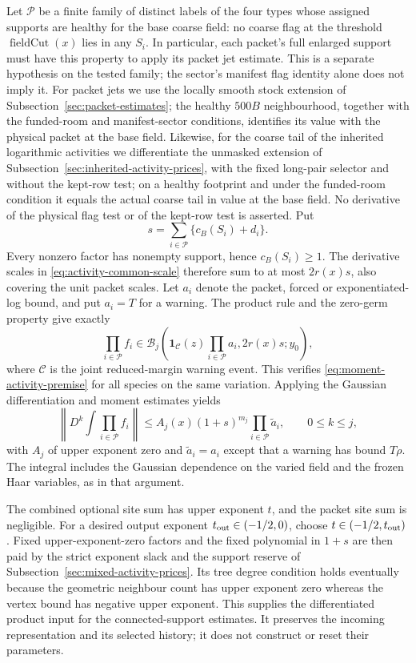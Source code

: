 Let $\mathcal P$ be a finite family of distinct labels of the
four types whose assigned supports are healthy for the base coarse
field: no coarse flag at the threshold $\operatorname{fieldCut}(x)$
lies in any $S_i$. In particular, each packet's full enlarged
support must have this property to apply its packet jet estimate.
This is a separate hypothesis on the tested family; the sector's
manifest flag identity alone does not imply it. For packet jets we
use the locally smooth stock extension of Subsection~\ref{sec:packet-estimates};
the healthy $500B$ neighbourhood, together with the funded-room and
manifest-sector conditions, identifies its value with the physical
packet at the base field. Likewise, for the coarse tail of the inherited
logarithmic activities we differentiate the unmasked extension of
Subsection~\ref{sec:inherited-activity-prices}, with the fixed long-pair
selector and without the kept-row test; on a healthy footprint and
under the funded-room condition it equals the actual coarse tail in
value at the base field. No derivative of the physical flag test or of
the kept-row test is asserted. Put
\[
 s=\sum_{i\in\mathcal P}\{c_B(S_i)+d_i\}.
\]
Every nonzero factor has nonempty support, hence $c_B(S_i)\ge1$.
The derivative scales in \eqref{eq:activity-common-scale}
therefore sum to at most $2r(x)s$, also covering the unit packet
scales. Let $a_i$ denote the packet, forced or exponentiated-log
bound, and put $a_i=T$ for a warning. The product rule and the
zero-germ property give exactly
\[
 \prod_{i\in\mathcal P}f_i
 \in\mathcal B_j\!\left(
 \mathbf1_{\mathcal C}(z)\prod_{i\in\mathcal P}a_i,
 2r(x)s;y_0\right),
\]
where $\mathcal C$ is the joint reduced-margin warning event.
This verifies \eqref{eq:moment-activity-premise} for all species
on the same variation. Applying the Gaussian differentiation
and moment estimates yields
\begin{equation}\label{eq:activity-integrated-jet}
 \left\|D^k\int\prod_{i\in\mathcal P}f_i\right\|
 \le A_j(x)(1+s)^{m_j}
             \prod_{i\in\mathcal P}\widetilde a_i,
 \qquad 0\le k\le j,
\end{equation}
with $A_j$ of upper exponent zero and
$\widetilde a_i=a_i$ except that a warning has bound $T\rho$.
The integral includes the Gaussian dependence on the varied
field and the frozen Haar variables, as in that argument.

The combined optional site sum has upper exponent $t$, and
the packet site sum is negligible. For a desired output exponent
$t_{\rm out}\in(-1/2,0)$, choose $t\in(-1/2,t_{\rm out})$. Fixed
upper-exponent-zero factors and the fixed polynomial in $1+s$
are then paid by the strict exponent slack and the support
reserve of Subsection~\ref{sec:mixed-activity-prices}. Its tree
degree condition holds eventually because the geometric
neighbour count has upper exponent zero whereas the vertex
bound has negative upper exponent. This supplies the
differentiated product input for the connected-support estimates.
It preserves the incoming representation and its selected
history; it does not construct or reset their parameters.
